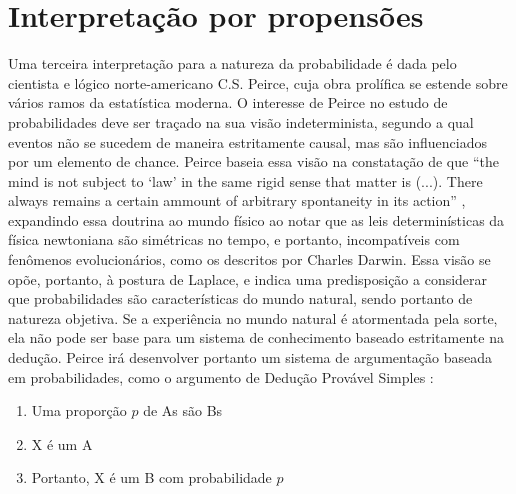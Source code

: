 \section{Interpretação por propensões}

Uma terceira interpretação para a natureza da probabilidade é dada pelo cientista e lógico norte-americano C.S. Peirce,
cuja obra prolífica se estende sobre vários ramos da estatística moderna. 
O interesse de Peirce no estudo de probabilidades
deve ser traçado na sua visão indeterminista, segundo a qual eventos não se sucedem de maneira estritamente causal, mas são
influenciados por um elemento de chance. Peirce baseia essa visão na constatação de que ``the mind is not subject to `law'
in the same rigid sense that matter is (...). There always remains a certain ammount of arbitrary spontaneity in its action''
\citep{Peirce1892}, expandindo essa doutrina ao mundo físico ao notar que as leis determinísticas 
da física newtoniana são simétricas no tempo, e portanto, incompatíveis com fenômenos evolucionários, como os descritos por
Charles Darwin. %
Essa visão se opõe, portanto, à postura de Laplace, e indica uma predisposição a considerar que probabilidades
são características do mundo natural, sendo portanto de natureza
objetiva. %
Se a experiência no mundo natural é %
atormentada pela sorte, ela não pode ser base para um sistema de
conhecimento baseado estritamente na dedução. 
Peirce irá desenvolver
portanto um sistema de argumentação baseada em probabilidades, como o argumento de Dedução Provável Simples \citep{Fetzer93}:

\begin{enumerate}
	\item Uma proporção $p$ de As são Bs
	\item X é um A
	\item Portanto, X é um B com probabilidade $p$ 
\end{enumerate}

